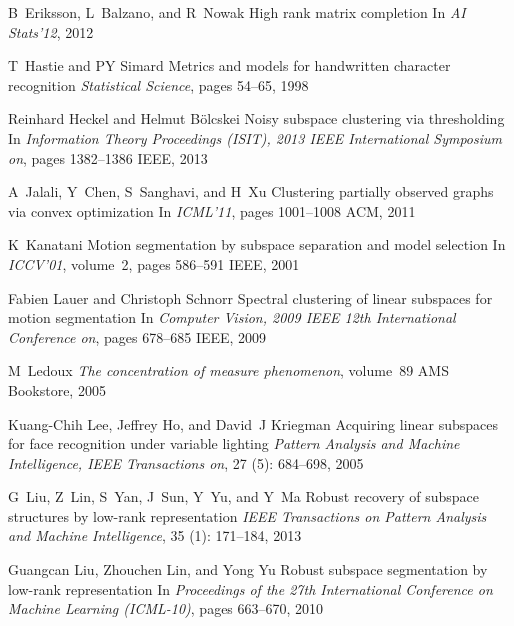 \documentclass[12pt,heading]{ctexbook}
\begin{document}
\begin{thebibliography}{99}
    B~Eriksson, L~Balzano, and R~Nowak
    \newblock High rank matrix completion
    \newblock In \emph{AI Stats'12}, 2012

    T~Hastie and PY Simard
    \newblock Metrics and models for handwritten character recognition
    \newblock \emph{Statistical Science}, pages 54--65, 1998

    Reinhard Heckel and Helmut B{\"o}lcskei
    \newblock Noisy subspace clustering via thresholding
    \newblock In \emph{Information Theory Proceedings (ISIT), 2013 IEEE
    International Symposium on}, pages 1382--1386 IEEE, 2013

    A~Jalali, Y~Chen, S~Sanghavi, and H~Xu
    \newblock Clustering partially observed graphs via convex optimization
    \newblock In \emph{ICML'11}, pages 1001--1008 ACM, 2011

    K~Kanatani
    \newblock Motion segmentation by subspace separation and model selection
    \newblock In \emph{ICCV'01}, volume~2, pages 586--591 IEEE, 2001

    Fabien Lauer and Christoph Schnorr
    \newblock Spectral clustering of linear subspaces for motion segmentation
    \newblock In \emph{Computer Vision, 2009 IEEE 12th International Conference
    on}, pages 678--685 IEEE, 2009

    M~Ledoux
    \newblock \emph{The concentration of measure phenomenon}, volume~89
    \newblock AMS Bookstore, 2005

    Kuang-Chih Lee, Jeffrey Ho, and David~J Kriegman
    \newblock Acquiring linear subspaces for face recognition under variable
    lighting
    \newblock \emph{Pattern Analysis and Machine Intelligence, IEEE Transactions
    on}, 27 (5): 684--698, 2005

    G~Liu, Z~Lin, S~Yan, J~Sun, Y~Yu, and Y~Ma
    \newblock Robust recovery of subspace structures by low-rank representation
    \newblock \emph{IEEE Transactions on Pattern Analysis and Machine
    Intelligence}, 35 (1): 171--184, 2013

    Guangcan Liu, Zhouchen Lin, and Yong Yu
    \newblock Robust subspace segmentation by low-rank representation
    \newblock In \emph{Proceedings of the 27th International Conference on Machine
    Learning (ICML-10)}, pages 663--670, 2010


\end{thebibliography}
\end{document}
